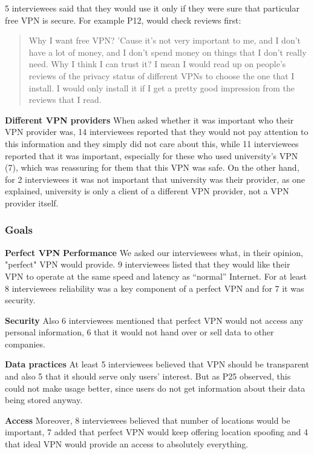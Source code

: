 5 interviewees said that they would use it only if they were sure that particular free VPN is secure. For example P12, would check reviews first:
\begin{quote}Why I want free VPN? 'Cause it's not very important to me, and I don't have a lot of money, and I don't spend money on things that I don't really need. Why I think I can trust it? I mean I would read up on people's reviews of the privacy status of different VPNs to choose the one that I install. I would only install it if I get a pretty good impression from the reviews that I read.\end{quote}

\textbf{Different VPN providers} When asked whether it was important who their VPN provider was, 14 interviewees reported that they would not pay attention to this information and they simply did not care about this, while 11 interviewees reported that it was important, especially for these who used university’s VPN (7), which was reassuring for them that this VPN was safe. On the other hand, for 2 interviewees it was not important that university was their provider, as one explained, university is only a client of a different VPN provider, not a VPN provider itself. 


\subsubsection{Goals}

\textbf{Perfect VPN}
\textbf{Performance} We asked our interviewees what, in their opinion, "perfect" VPN would provide. 9 interviewees listed that they would like their VPN to operate at the same speed and latency as  “normal” Internet. For at least 8 interviewees reliability was a key component of a perfect VPN and for 7 it was security. 

\textbf{Security} Also 6 interviewees mentioned that perfect VPN would not access any personal information, 6 that it would not hand over or sell data to other companies. 

\textbf{Data practices} At least 5 interviewees believed that VPN should be transparent and also 5 that it should serve only users' interest. But as P25 observed, this could not make usage better, since users do not get information about their data being stored anyway.


\textbf{Access} Moreover, 8 interviewees believed that number of locations would be important, 7 added that perfect VPN would keep offering location spoofing and 4 that ideal VPN would provide an access to absolutely everything.

